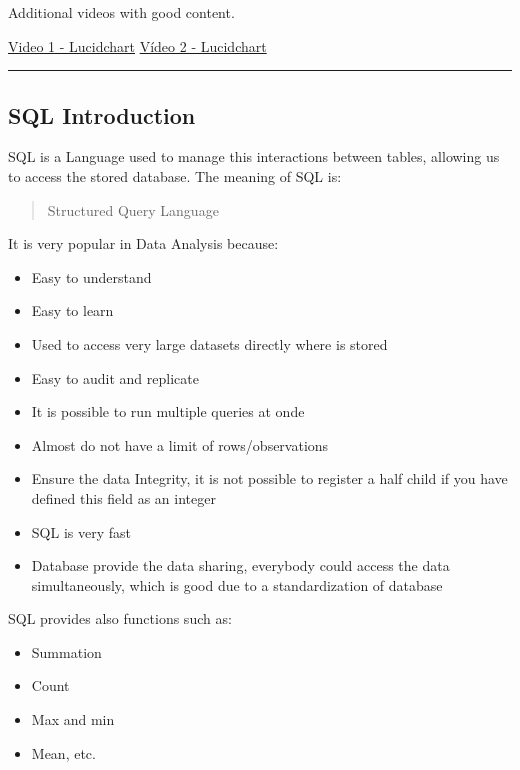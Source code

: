 \documentclass[]{book}
\providecommand{\tightlist}{%
  \setlength{\itemsep}{0pt}\setlength{\parskip}{0pt}}
\begin{document}
Additional videos with good content.

\href{https://www.youtube.com/watch?v=QpdhBUYk7Kk\&vl=en}{Video 1 -
Lucidchart} \href{https://www.youtube.com/watch?v=-CuY5ADwn24}{Vídeo 2 -
Lucidchart}

\begin{center}\rule{0.5\linewidth}{\linethickness}\end{center}

\subsection{SQL Introduction}\label{sql-introduction}

SQL is a Language used to manage this interactions between tables,
allowing us to access the stored database. The meaning of SQL is:

\begin{quote}
Structured Query Language
\end{quote}

It is very popular in Data Analysis because:

\begin{itemize}
\tightlist
\item
  Easy to understand
\item
  Easy to learn
\item
  Used to access very large datasets directly where is stored
\item
  Easy to audit and replicate
\item
  It is possible to run multiple queries at onde
\item
  Almost do not have a limit of rows/observations
\item
  Ensure the data Integrity, it is not possible to register a half child
  if you have defined this field as an integer
\item
  SQL is very fast
\item
  Database provide the data sharing, everybody could access the data
  simultaneously, which is good due to a standardization of database
\end{itemize}

SQL provides also functions such as:

\begin{itemize}
\tightlist
\item
  Summation
\item
  Count
\item
  Max and min
\item
  Mean, etc.
\end{itemize}
\end{document}
